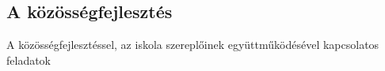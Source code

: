 \subsection{A közösségfejlesztés}

A közösségfejlesztéssel, az iskola szereplőinek együttműködésével kapcsolatos feladatok

